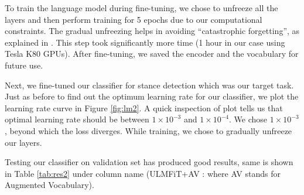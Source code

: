   
To train the language model during fine-tuning, we chose to unfreeze all the layers and then perform training for 5 epochs due to our computational constraints. The gradual unfreezing helps in avoiding ``catastrophic forgetting'', as explained in \cite{howard2018universal}. This step took significantly more time (1 hour in our case using Tesla K80 GPUs). After fine-tuning, we saved the encoder and the vocabulary 
for future use. 
\begin{table}[h!]
	\centering
\caption{Unfreezing the entire model}
\end{table}


Next, we fine-tuned our classifier for stance detection which was our target task.
Just as before to find out the optimum learning rate for our classifier, we plot the learning rate curve in Figure \ref{fig:lm2}. A quick inspection of plot tells us that optimal learning rate should be between $1\times 10^{-3}$ and $1\times 10^{-4}$. We chose $1\times 10^{-3}$, beyond which the loss diverges. While training, we chose to gradually unfreeze our layers. 




Testing our classifier on validation set has produced good results, same is shown in Table \ref{tab:res2} under column name (ULMFiT+AV : where AV stands for Augmented Vocabulary). 